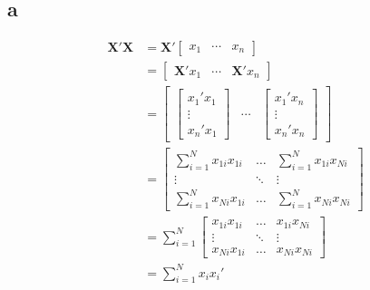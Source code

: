 \documentclass[12pt,notitlepage]{article}
\begin{document}
\subsection*{a}
\begin{align*}
    \bm{X'X} &= 
    \bm{X'}
    \begin{bmatrix}
    x_1 & \cdots & x_n
    \end{bmatrix} \\
    &= \begin{bmatrix}
    \bm{X'}x_1 & \cdots & \bm{X'}x_n
    \end{bmatrix} \\
    &= \begin{bmatrix}
    \begin{bmatrix}
    x_1'x_1 \\ \vdots \\ x_n'x_1 
    \end{bmatrix} & 
    \cdots &  
    \begin{bmatrix}
    x_1'x_n \\ \vdots \\ x_n'x_n
    \end{bmatrix}
    \end{bmatrix} \\
    &= \begin{bmatrix}
    \sum_{i=1}^N x_{1i}x_{1i} & \hdots & \sum_{i=1}^N x_{1i}x_{Ni} \\
    \vdots & \ddots & \vdots \\
    \sum_{i=1}^N x_{Ni}x_{1i} & \hdots & \sum_{i=1}^N x_{Ni}x_{Ni}
    \end{bmatrix} \\ 
    &= \sum_{i=1}^N \begin{bmatrix}
     x_{1i}x_{1i} & \hdots &  x_{1i}x_{Ni} \\
    \vdots & \ddots & \vdots \\
     x_{Ni}x_{1i} & \hdots & x_{Ni}x_{Ni}
    \end{bmatrix} \\ 
    &= \sum_{i=1}^N x_ix_i' \\ 
\end{align*}
\end{document}
